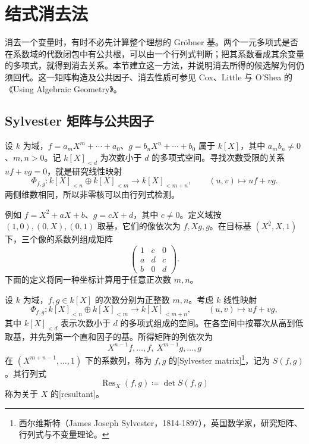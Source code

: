 
\section{结式消去法}
\label{b3:sec:0806}

消去一个变量时，有时不必先计算整个理想的 Gröbner 基。两个一元多项式是否在系数域的代数闭包中有公共根，可以由一个行列式判断；把其系数看成其余变量的多项式，就得到消去关系。本节建立这一方法，并说明消去所得的候选解为何仍须回代。这一矩阵构造及公共因子、消去性质可参见 Cox、Little 与 O'Shea 的《Using Algebraic Geometry》\cite[Chapter 3, \S 1, pp. 71--72]{CoxLittleOShea1998UsingAG}。

\subsection{Sylvester 矩阵与公共因子}
\label{b3:subsec:0806:01}

设 \(k\) 为域，\(f=a_mX^m+\cdots+a_0\)、\(g=b_nX^n+\cdots+b_0\) 属于 \(k[X]\)，其中 \(a_m b_n\ne0\)、\(m,n>0\)。记 \(k[X]_{<d}\) 为次数小于 \(d\) 的多项式空间。寻找次数受限的关系 \(uf+vg=0\)，就是研究线性映射
\[
	\Phi_{f,g}:k[X]_{<n}\oplus k[X]_{<m} \longrightarrow k[X]_{<m+n},\qquad (u,v)\longmapsto uf+vg.
\]
两侧维数相同，所以非零核可以由行列式检测。

例如 \(f=X^2+aX+b\)、\(g=cX+d\)，其中 \(c\ne0\)。定义域按 \((1,0),(0,X),(0,1)\) 取基，它们的像依次为 \(f,Xg,g\)。在目标基 \((X^2,X,1)\) 下，三个像的系数列组成矩阵
\[
	\begin{pmatrix}1&c&0\\a&d&c\\b&0&d\end{pmatrix}.
\]
下面的定义将同一种坐标计算用于任意正次数 \(m,n\)。

\begin{definition}\label{b3:def:resultant}
	设 \(k\) 为域，\(f,g\in k[X]\) 的次数分别为正整数 \(m,n\)。考虑 \(k\) 线性映射
	\[
		\Phi_{f,g}:k[X]_{<n}\oplus k[X]_{<m}\longrightarrow k[X]_{<m+n}, \qquad (u,v)\longmapsto uf+vg,
	\]
	其中 \(k[X]_{<d}\) 表示次数小于 \(d\) 的多项式组成的空间。在各空间中按幂次从高到低取基，并先列第一个直和因子的基。所得矩阵的列依次为
	\[
		X^{n-1}f,\ldots,f,\ X^{m-1}g,\ldots,g
	\]
	在 \((X^{m+n-1},\ldots,1)\) 下的系数列，称为 \(f,g\) 的[Sylvester matrix]\footnote{西尔维斯特（James Joseph Sylvester，1814-1897），英国数学家，研究矩阵、行列式与不变量理论。}，记为 \(S(f,g)\)。其行列式
	\[
		\operatorname{Res}_X(f,g)\coloneqq\det S(f,g)
	\]
	称为关于 \(X\) 的[resultant]。
\end{definition}

